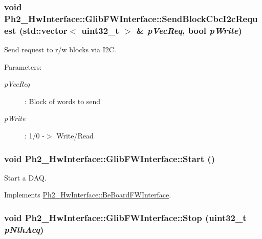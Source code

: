 \hypertarget{class_ph2___hw_interface_1_1_glib_f_w_interface_17a0f55fc06cc6f0b334f7debcf733d3}{
\subsubsection[SendBlockCbcI2cRequest]{\setlength{\rightskip}{0pt plus 5cm}void Ph2\_\-Hw\-Interface::Glib\-FWInterface::Send\-Block\-Cbc\-I2c\-Request (std::vector$<$ uint32\_\-t $>$ \& {\em p\-Vec\-Req}, bool {\em p\-Write})}}
\label{class_ph2___hw_interface_1_1_glib_f_w_interface_17a0f55fc06cc6f0b334f7debcf733d3}


Send request to r/w blocks via I2C. 

\begin{Desc}
\item[Parameters:]
\begin{description}
\item[{\em p\-Vec\-Req}]: Block of words to send \item[{\em p\-Write}]: 1/0 -$>$ Write/Read \end{description}
\end{Desc}
\hypertarget{class_ph2___hw_interface_1_1_glib_f_w_interface_debd47ee3a84dbb8b60f6dd521921aac}{
\subsubsection[Start]{\setlength{\rightskip}{0pt plus 5cm}void Ph2\_\-Hw\-Interface::Glib\-FWInterface::Start ()}}
\label{class_ph2___hw_interface_1_1_glib_f_w_interface_debd47ee3a84dbb8b60f6dd521921aac}


Start a DAQ. 



Implements \hyperlink{class_ph2___hw_interface_1_1_be_board_f_w_interface_03bccd64fb4656dc0f9735618860ca35}{Ph2\_\-Hw\-Interface::Be\-Board\-FWInterface}.\hypertarget{class_ph2___hw_interface_1_1_glib_f_w_interface_d980b1ab04d9f87f1a26978201e42997}{
\subsubsection[Stop]{\setlength{\rightskip}{0pt plus 5cm}void Ph2\_\-Hw\-Interface::Glib\-FWInterface::Stop (uint32\_\-t {\em p\-Nth\-Acq})}}
\label{class_ph2___hw_interface_1_1_glib_f_w_interface_d980b1ab04d9f87f1a26978201e42997}


